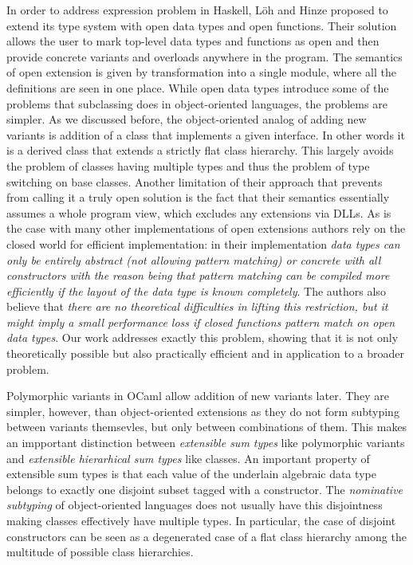 \documentclass[preprint]{sigplanconf}
\begin{document}
In order to address expression problem in Haskell, L\"{o}h and Hinze proposed to 
extend its type system with open data types and open functions\cite{LohHinze2006}.
Their solution allows the user to mark top-level data types and functions as 
open and then provide concrete variants and overloads anywhere in the program. 
The semantics of open extension is given by transformation into a single module, 
where all the definitions are seen in one place. While open data types introduce 
some of the problems that subclassing does in object-oriented languages, the 
problems are simpler. As we discussed before, the object-oriented analog of 
adding new variants is addition of a class that implements a given interface. In 
other words it is a derived class that extends a strictly flat class hierarchy. 
This largely avoids the problem of classes having multiple types and thus the 
problem of type switching on base classes. Another limitation of their approach 
that prevents from calling it a truly open solution is the fact that their 
semantics essentially assumes a whole program view, which excludes any 
extensions via DLLs. As is the case with many other implementations of open 
extensions authors rely on the closed world for efficient implementation: in 
their implementation \emph{data types can only be entirely abstract (not 
allowing pattern matching) or concrete with all constructors with the reason 
being that pattern matching can be compiled more efficiently if the layout of 
the data type is known completely}. The authors also believe that \emph{there 
are no theoretical difficulties in lifting this restriction, but it might imply 
a small performance loss if closed functions pattern match on open data types}. 
Our work addresses exactly this problem, showing that it is not only 
theoretically possible but also practically efficient and in application to a 
broader problem.

Polymorphic variants in OCaml\cite{garrigue-98} allow addition of new variants 
later. They are simpler, however, than object-oriented extensions as they do not 
form subtyping between variants themsevles, but only between combinations of them. 
This makes an impportant distinction between \emph{extensible sum types} like 
polymorphic variants and \emph{extensible hierarhical sum types} like classes.
An important property of extensible sum types is that each value of the 
underlain algebraic data type belongs to exactly one disjoint subset tagged with 
a constructor. The \emph{nominative subtyping} of object-oriented languages does 
not usually have this disjointness making classes effectively have multiple 
types. In particular, the case of disjoint constructors can be seen as a 
degenerated case of a flat class hierarchy among the multitude of possible class 
hierarchies.
\end{document}
